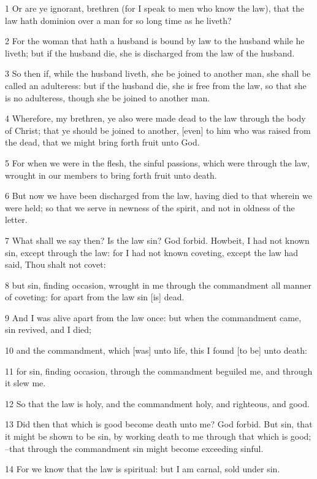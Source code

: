 \par 1 Or are ye ignorant, brethren (for I speak to men who know the law), that the law hath dominion over a man for so long time as he liveth?
\par 2 For the woman that hath a husband is bound by law to the husband while he liveth; but if the husband die, she is discharged from the law of the husband.
\par 3 So then if, while the husband liveth, she be joined to another man, she shall be called an adulteress: but if the husband die, she is free from the law, so that she is no adulteress, though she be joined to another man.
\par 4 Wherefore, my brethren, ye also were made dead to the law through the body of Christ; that ye should be joined to another, [even] to him who was raised from the dead, that we might bring forth fruit unto God.
\par 5 For when we were in the flesh, the sinful passions, which were through the law, wrought in our members to bring forth fruit unto death.
\par 6 But now we have been discharged from the law, having died to that wherein we were held; so that we serve in newness of the spirit, and not in oldness of the letter.
\par 7 What shall we say then? Is the law sin? God forbid. Howbeit, I had not known sin, except through the law: for I had not known coveting, except the law had said, Thou shalt not covet:
\par 8 but sin, finding occasion, wrought in me through the commandment all manner of coveting: for apart from the law sin [is] dead.
\par 9 And I was alive apart from the law once: but when the commandment came, sin revived, and I died;
\par 10 and the commandment, which [was] unto life, this I found [to be] unto death:
\par 11 for sin, finding occasion, through the commandment beguiled me, and through it slew me.
\par 12 So that the law is holy, and the commandment holy, and righteous, and good.
\par 13 Did then that which is good become death unto me? God forbid. But sin, that it might be shown to be sin, by working death to me through that which is good; --that through the commandment sin might become exceeding sinful.
\par 14 For we know that the law is spiritual: but I am carnal, sold under sin.
